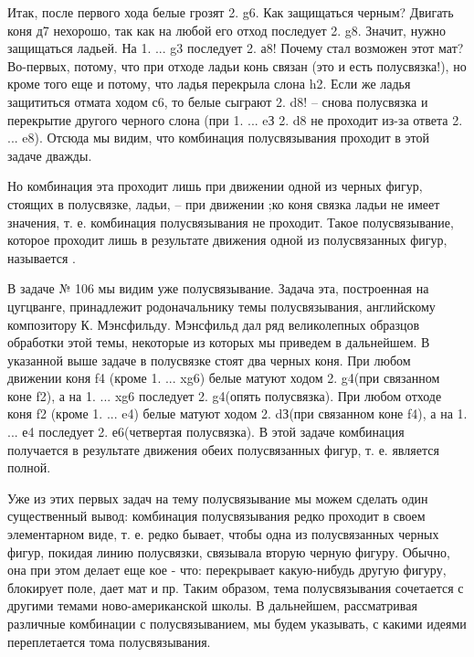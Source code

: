 Итак, после первого хода белые грозят 2. \knight{}g6\mate{}. Как защищаться черным? Двигать коня д7 нехорошо, так как на любой его отход последует 2. \queen{}g8\mate{}. Значит, нужно защищаться ладьей. На 1. ... \rook{}g3 последует 2. \queen{}а8\mate{}! Почему стал возможен этот мат? Во-первых, потому, что при отходе ладьи конь связан (это и есть полусвязка!), но кроме того еще и потому, что ладья перекрыла слона h2. Если же ладья защититься отмата ходом \rook{}с6, то белые сыграют 2. \rook{}d8\mate{}! -- снова полусвязка и перекрытие другого черного слона (при 1. ... \rook{}eЗ 2. \rook{}d8 не проходит из-за ответа 2. ... \bishop{}e8). Отсюда мы видим, что комбинация полусвязывания проходит в этой задаче дважды.

Но комбинация эта проходит лишь при движении одной из черных фигур, стоящих в полусвязке, ладьи, -- при движении ;ко коня связка ладьи не имеет значения, т. е. комбинация полусвязывания не проходит. Такое полусвязывание, которое проходит лишь в результате движения одной из полусвязанных фигур, называется .

В задаче № 106 мы видим уже  полусвязывание. Задача эта, построенная на цугцванге, принадлежит родоначальнику темы полусвязывания, английскому композитору К. Мэнсфильду. Мэнсфильд дал ряд великолепных образцов обработки этой темы, некоторые из которых мы приведем в дальнейшем. В указанной выше задаче в полусвязке стоят два черных коня. При любом движении коня f4 (кроме 1. ... \knight{}xg6) белые матуют ходом 2. \queen{}g4\mate (при связанном коне f2), а на 1. ... \knight{}xg6 последует 2. g4\mate (опять полусвязка). При любом отходе коня f2 (кроме 1. ... \knight{}e4) белые матуют ходом 2. \queen{}dЗ\mate (при связанном коне f4), а на 1. ... \knight{}е4 последует 2. \queen{}е6\mate (четвертая полусвязка). В этой задаче комбинация получается в результате движения обеих полусвязанных фигур, т. е. является полной.

Уже из этих первых задач на тему полусвязывание мы можем сделать один существенный вывод: комбинация полусвязывания редко проходит в своем элементарном виде, т. е. редко бывает, чтобы одна из полусвязанных черных фигур, покидая линию полусвязки,  связывала вторую черную фигуру. Обычно, она при этом делает еще кое - что: перекрывает какую-нибудь другую фигуру, блокирует поле, дает мат и пр. Таким образом, тема полусвязывания сочетается с другими темами ново-американской школы. В дальнейшем, рассматривая различные комбинации с полусвязыванием, мы будем указывать, с какими идеями переплетается тома полусвязывания.


